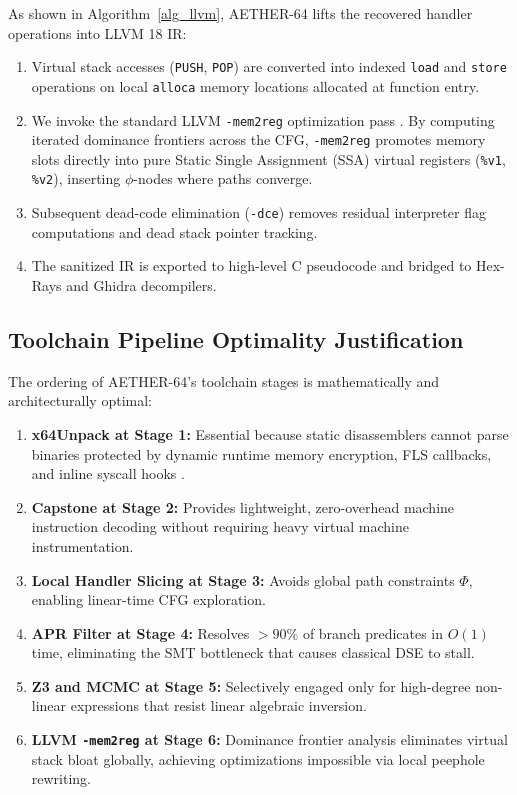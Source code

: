 \documentclass[11pt,a4paper]{article}
\begin{document}
As shown in Algorithm~\ref{alg_llvm}, AETHER-64 lifts the recovered handler operations into LLVM 18 IR:
\begin{enumerate}
    \item Virtual stack accesses (\texttt{PUSH}, \texttt{POP}) are converted into indexed \texttt{load} and \texttt{store} operations on local \texttt{alloca} memory locations allocated at function entry.
    \item We invoke the standard LLVM \texttt{-mem2reg} optimization pass \cite{llvm, cytron1991}. By computing iterated dominance frontiers across the CFG, \texttt{-mem2reg} promotes memory slots directly into pure Static Single Assignment (SSA) virtual registers (\texttt{\%v1}, \texttt{\%v2}), inserting $\phi$-nodes where paths converge.
    \item Subsequent dead-code elimination (\texttt{-dce}) removes residual interpreter flag computations and dead stack pointer tracking.
    \item The sanitized IR is exported to high-level C pseudocode and bridged to Hex-Rays and Ghidra decompilers.
\end{enumerate}

\subsection{Toolchain Pipeline Optimality Justification}
The ordering of AETHER-64's toolchain stages is mathematically and architecturally optimal:
\begin{enumerate}
    \item \textbf{x64Unpack at Stage 1:} Essential because static disassemblers cannot parse binaries protected by dynamic runtime memory encryption, FLS callbacks, and inline syscall hooks \cite{x64unpack}.
    \item \textbf{Capstone at Stage 2:} Provides lightweight, zero-overhead machine instruction decoding without requiring heavy virtual machine instrumentation.
    \item \textbf{Local Handler Slicing at Stage 3:} Avoids global path constraints $\Phi$, enabling linear-time CFG exploration.
    \item \textbf{APR Filter at Stage 4:} Resolves $>90\%$ of branch predicates in $O(1)$ time, eliminating the SMT bottleneck that causes classical DSE to stall.
    \item \textbf{Z3 and MCMC at Stage 5:} Selectively engaged only for high-degree non-linear expressions that resist linear algebraic inversion.
    \item \textbf{LLVM \texttt{-mem2reg} at Stage 6:} Dominance frontier analysis eliminates virtual stack bloat globally, achieving optimizations impossible via local peephole rewriting.
\end{enumerate}
\end{document}
